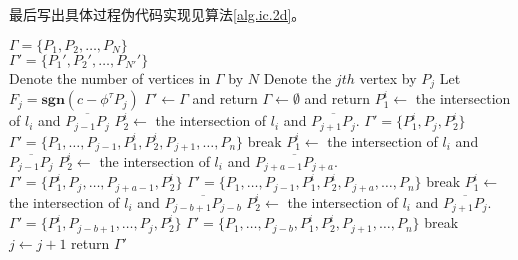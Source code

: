 最后写出具体过程伪代码实现见算法\ref{alg.ic.2d}。
\begin{algo}%
\caption{$\mathbf{AddLinear2D}$}
\label{alg.ic.2d}
\begin{algorithmic}
\REQUIRE $\Gamma=\{P_{1},P_{2},\ldots,P_{N}\}$\\
\ENSURE $\Gamma'=\{P_{1}',P_{2}',\ldots,P_{N'}'\}$\\
\STATE Denote the number of vertices in $\Gamma$ by $N$
	\STATE Denote the $jth$ vertex by $P_{j}$
	\STATE Let $F_{j}=\mathbf{sgn}(c-\phi^{\tau}P_{j})$
\ENDFOR
{}
	\STATE $\Gamma'\leftarrow\Gamma$ and return
	\STATE $\Gamma\leftarrow\emptyset$ and return
\ENDIF
{}
		\STATE $P_{1}^{i}\leftarrow$ the intersection of $l_{i}$ and $\overline{P_{j-1}P_{j}}$
		\STATE $P_{2}^{i}\leftarrow$ the intersection of $l_{i}$ and $\overline{P_{j+1}P_{j}}$.
			\STATE$\Gamma'=\{P_{1}^{i},P_{j},P_{2}^{i}\}$
		\ELSE
			\STATE$\Gamma'=\{P_{1},\ldots,P_{j-1},P_{1}^{i},P_{2}^{i},P_{j+1},\ldots,P_{n}\}$
		\ENDIF
        \STATE break
		\STATE $P_{1}^{i}\leftarrow$ the intersection of $l_{i}$ and $\overline{P_{j-1}P_{j}}$
		\STATE $P_{2}^{i}\leftarrow$ the intersection of $l_{i}$ and $\overline{P_{j+a-1}P_{j+a}}$.
			\STATE$\Gamma'=\{P_{1}^{i},P_{j},\ldots,P_{j+a-1},P_{2}^{i}\}$
		\ELSE
			\STATE$\Gamma'=\{P_{1},\ldots,P_{j-1},P_{1}^{i},P_{2}^{i},P_{j+a},\ldots,P_{n}\}$
		\ENDIF
        \STATE break
		\STATE $P_{1}^{i}\leftarrow$ the intersection of $l_{i}$ and $\overline{P_{j-b+1}P_{j-b}}$
		\STATE $P_{2}^{i}\leftarrow$ the intersection of $l_{i}$ and $\overline{P_{j+1}P_{j}}$.
			\STATE$\Gamma'=\{P_{1}^{i},P_{j-b+1},\ldots,P_{j},P_{2}^{i}\}$
		\ELSE
			\STATE$\Gamma'=\{P_{1},\ldots,P_{j-b},P_{1}^{i},P_{2}^{i},P_{j+1},\ldots,P_{n}\}$
		\ENDIF
        \STATE break
    \ENDIF
	\STATE $j\leftarrow j+1$
\ENDFOR
\STATE return $\Gamma'$
\end{algorithmic}
\end{algo}

